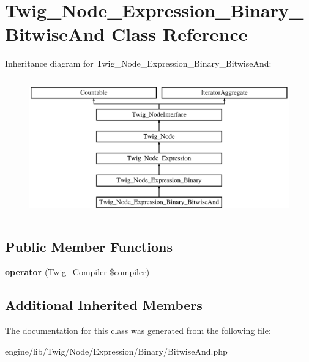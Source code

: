 \hypertarget{class_twig___node___expression___binary___bitwise_and}{}\section{Twig\+\_\+\+Node\+\_\+\+Expression\+\_\+\+Binary\+\_\+\+Bitwise\+And Class Reference}
\label{class_twig___node___expression___binary___bitwise_and}
Inheritance diagram for Twig\+\_\+\+Node\+\_\+\+Expression\+\_\+\+Binary\+\_\+\+Bitwise\+And\+:\begin{figure}[H]
\begin{center}
\leavevmode
\includegraphics[height=6.000000cm]{class_twig___node___expression___binary___bitwise_and}
\end{center}
\end{figure}
\subsection*{Public Member Functions}
\begin{DoxyCompactItemize}
\item 
\hypertarget{class_twig___node___expression___binary___bitwise_and_af77318ec88d5f8a508684970a150b670}{}{\bfseries operator} (\hyperlink{class_twig___compiler}{Twig\+\_\+\+Compiler} \$compiler)\label{class_twig___node___expression___binary___bitwise_and_af77318ec88d5f8a508684970a150b670}

\end{DoxyCompactItemize}
\subsection*{Additional Inherited Members}


The documentation for this class was generated from the following file\+:\begin{DoxyCompactItemize}
\item 
engine/lib/\+Twig/\+Node/\+Expression/\+Binary/Bitwise\+And.\+php\end{DoxyCompactItemize}
